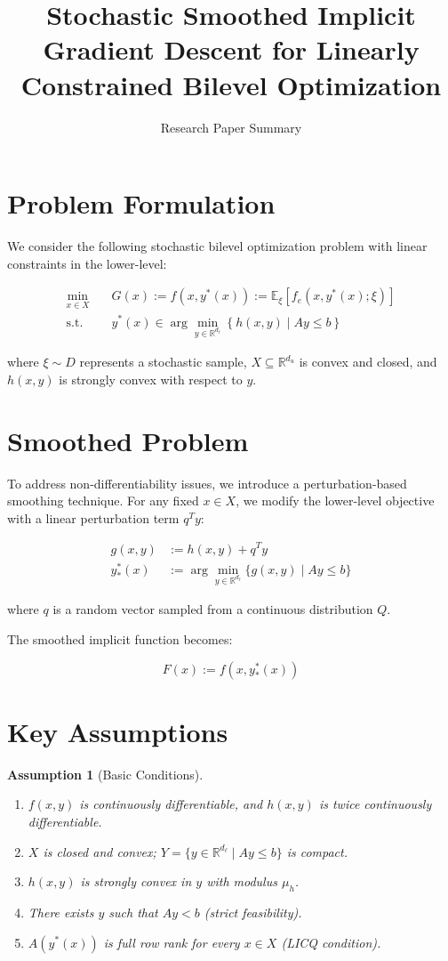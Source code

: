\documentclass[11pt]{article}
\title{Stochastic Smoothed Implicit Gradient Descent for Linearly Constrained Bilevel Optimization}
\author{Research Paper Summary}
\date{}
\newtheorem{assumption}{Assumption}
\begin{document}
\maketitle

\section{Problem Formulation}

We consider the following stochastic bilevel optimization problem with linear constraints in the lower-level:

\begin{align}
\min_{x \in X} \quad & G(x) := f(x, y^*(x)) := \mathbb{E}_\xi[f_e(x, y^*(x); \xi)] \label{eq:ul}\\
\text{s.t.} \quad & y^*(x) \in \arg\min_{y \in \mathbb{R}^{d_\ell}} \left\{ h(x, y) \mid Ay \leq b \right\} \label{eq:ll}
\end{align}

where $\xi \sim D$ represents a stochastic sample, $X \subseteq \mathbb{R}^{d_u}$ is convex and closed, and $h(x, y)$ is strongly convex with respect to $y$.

\section{Smoothed Problem}

To address non-differentiability issues, we introduce a perturbation-based smoothing technique. For any fixed $x \in X$, we modify the lower-level objective with a linear perturbation term $q^T y$:

\begin{align}
g(x, y) &:= h(x, y) + q^T y\\
y_*^*(x) &:= \arg\min_{y \in \mathbb{R}^{d_\ell}} \{g(x, y) \mid Ay \leq b\}
\end{align}

where $q$ is a random vector sampled from a continuous distribution $Q$.

The smoothed implicit function becomes:

$$
F(x) := f(x, y_*^*(x))
$$

\section{Key Assumptions}

\begin{assumption}[Basic Conditions]
\begin{enumerate}
\item[(a)] $f(x, y)$ is continuously differentiable, and $h(x, y)$ is twice continuously differentiable.
\item[(b)] $X$ is closed and convex; $Y = \{y \in \mathbb{R}^{d_\ell} \mid Ay \leq b\}$ is compact.
\item[(c)] $h(x, y)$ is strongly convex in $y$ with modulus $\mu_h$.
\item[(d)] There exists $y$ such that $Ay < b$ (strict feasibility).
\item[(e)] $A(y^*(x))$ is full row rank for every $x \in X$ (LICQ condition).
\end{enumerate}
\end{assumption}
\end{document}

